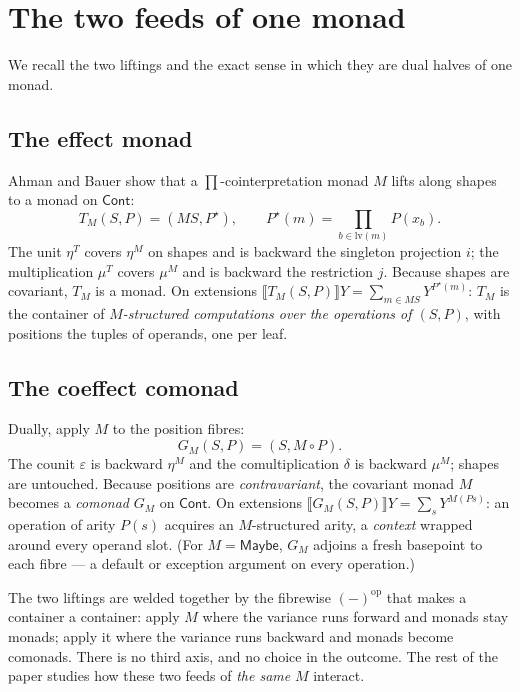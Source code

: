 \documentclass[11pt]{amsart}
\theoremstyle{plain}
\theoremstyle{definition}
\theoremstyle{remark}
\newcommand{\Cont}{\mathsf{Cont}}
\newcommand{\op}{\mathrm{op}}
\newcommand{\lv}{\mathrm{lv}}
\newcommand{\Ext}[1]{\llbracket #1\rrbracket}
\newcommand{\cont}[2]{(#1,#2)}
\newcommand{\Maybe}{\mathsf{Maybe}}
\begin{document}
\section{The two feeds of one monad}\label{sec:feeds}

We recall the two liftings and the exact sense in which they are dual halves of one monad.

\subsection{The effect monad}
Ahman and Bauer \cite[Thm.~6.3]{AhmanBauer24} show that a $\prod$-cointerpretation monad $M$
lifts along shapes to a monad on $\Cont$:
\[
  T_M\cont S P = \cont{MS}{P^\star},\qquad P^\star(m)=\prod_{b\in\lv(m)}P(x_b).
\]
The unit $\eta^T$ covers $\eta^M$ on shapes and is backward the singleton projection $i$; the
multiplication $\mu^T$ covers $\mu^M$ and is backward the restriction $j$. Because shapes are
covariant, $T_M$ is a monad. On extensions $\Ext{T_M(S,P)}Y = \sum_{m\in MS} Y^{P^\star(m)}$:
$T_M$ is the container of \emph{$M$-structured computations over the operations of $\cont S
P$}, with positions the tuples of operands, one per leaf.

\subsection{The coeffect comonad}
Dually, apply $M$ to the position fibres:
\[
  G_M\cont S P = \cont S{M\circ P}.
\]
The counit $\varepsilon$ is backward $\eta^M$ and the comultiplication $\delta$ is backward
$\mu^M$; shapes are untouched. Because positions are \emph{contravariant}, the covariant
monad $M$ becomes a \emph{comonad} $G_M$ on $\Cont$. On extensions $\Ext{G_M(S,P)}Y =
\sum_{s} Y^{M(P s)}$: an operation of arity $P(s)$ acquires an $M$-structured arity, a
\emph{context} wrapped around every operand slot. (For $M=\Maybe$, $G_M$ adjoins a fresh
basepoint to each fibre --- a default or exception argument on every operation.)

The two liftings are welded together by the fibrewise $(-)^\op$ that makes a container a
container: apply $M$ where the variance runs forward and monads stay monads; apply it where
the variance runs backward and monads become comonads. There is no third axis, and no choice
in the outcome. The rest of the paper studies how these two feeds of \emph{the same} $M$
interact.
\end{document}
